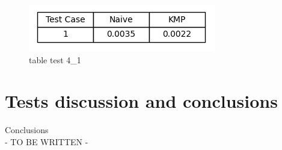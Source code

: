 \documentclass[11pt]{article}
\begin{document}
                \begin{figure}[H]
                    \centering
                    \includegraphics[width = 0.5 \textwidth]{table_execution_times_4_1}
                    \caption{table test 4\_1}
                    \label{fig:table_test_4_1}
                \end{figure}

    \newpage

    \section{Tests discussion and conclusions} \label{sec:conclusions}

        Conclusions \\
        - TO BE WRITTEN -
\end{document}
